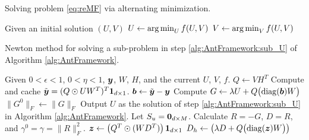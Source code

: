 \begin{algorithm}[t]
    \caption{Solving problem \eqref{eq:reMF} via alternating minimization.}
    \label{alg:AntFramework}
    \begin{algorithmic}[1]
        \State Given an initial solution $(U, V)$
            \State $U   \gets \operatorname*{arg\,min}_{U} f(U,V)$ \label{alg:AntFramework:sub_U}
            \State $V   \gets \operatorname*{arg\,min}_{V} f(U,V)$
        \EndWhile
    \end{algorithmic}
\end{algorithm}

\begin{algorithm}
    \caption{Newton method for solving a sub-problem in step \ref{alg:AntFramework:sub_U} of Algorithm \ref{alg:AntFramework}.}
    \label{alg:LrFrameworkU}
    \begin{algorithmic}[1]
        \State Given $0< \epsilon < 1$, $0<\eta<1$, $\boldsymbol{y}$, $W$, $H$, and the current $U$, $V$, $f$.
        \State $Q \gets VH^T$ %
        \State Compute and cache $\tilde{\boldsymbol{y}}= (Q \odot UW^T)^T\boldsymbol{1}_{d\times 1}$.
        \State $\boldsymbol{b} \gets \tilde{\boldsymbol{y}} - \boldsymbol{y}$
            \State Compute $G \gets \lambda U + Q \bigl(\operatorname*{diag}(\boldsymbol{b}) W \bigr)$
                \State $\|G^0\|_F \gets \|G\|_F$
            \EndIf
                \State Output $U$ as the solution of step \ref{alg:AntFramework:sub_U} in Algorithm \ref{alg:AntFramework}.
            \EndIf
            \State Let $S_u=\boldsymbol{0}_{d\times M}$.
            \State Calculate $R = -G$, $D=R$, and $\gamma^0=\gamma=\|R\|_F^2$.
            \State $\boldsymbol{z} \gets \left( {Q^T}\odot{(WD^T)} \right) \boldsymbol{1}_{d\times 1}$
            \label{alg:Pcg:compz}
            \State $D_h \gets \left(\lambda D + Q \bigl(\operatorname*{diag}(\boldsymbol{z}) W \bigr)\right)$

\end{algorithmic}
\end{algorithm}
